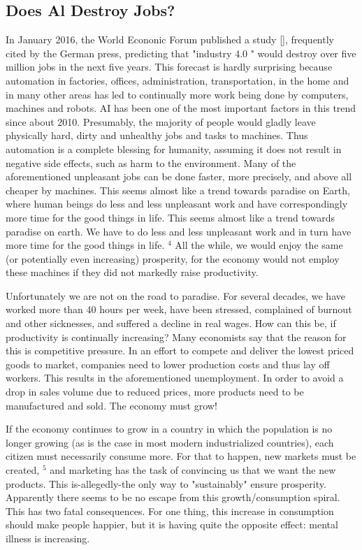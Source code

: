 \documentclass[10pt]{book}
\begin{document}
\subsection{Does Al Destroy Jobs?}
In January 2016, the World Econonic Forum published a study [\cite{ss16}], frequently cited by the German press, predicting that "industry 4.0 " would destroy over five\\
million jobs in the next five years. This forecast is hardly surprising because automation in factories, offices, administration, transportation, in the home and in many other areas has led to continually more work being done by computers, machines and robots. AI has been one of the most important factors in this trend since about 2010.
Presumably, the majority of people would gladly leave physically hard, dirty and unhealthy jobs and tasks to machines. Thus automation is a complete blessing for humanity, assuming it does not result in negative side effects, such as harm to the environment. Many of the aforementioned unpleasant jobs can be done faster, more precisely, and above all cheaper by machines. This seems almost like a trend towards paradise on Earth, where human beings do less and less unpleasant work and have correspondingly more time for the good things in life. This seems almost like a trend towards paradise on earth. We have to do less and less unpleasant work and in turn have more time for the good things in life. ${ }^{4}$ All the while, we would enjoy the same (or potentially even increasing) prosperity, for the economy would not employ these machines if they did not markedly raise productivity.

Unfortunately we are not on the road to paradise. For several decades, we have worked more than 40 hours per week, have been stressed, complained of burnout and other sicknesses, and suffered a decline in real wages. How can this be, if productivity is continually increasing? Many economists say that the reason for this is competitive pressure. In an effort to compete and deliver the lowest priced goods to market, companies need to lower production costs and thus lay off workers. This results in the aforementioned unemployment. In order to avoid a drop in sales volume due to reduced prices, more products need to be manufactured and sold. The economy must grow!

If the economy continues to grow in a country in which the population is no longer growing (as is the case in most modern industrialized countries), each citizen must necessarily consume more. For that to happen, new markets must be created, ${ }^{5}$ and marketing has the task of convincing us that we want the new products. This is-allegedly-the only way to "sustainably" ensure prosperity. Apparently there seems to be no escape from this growth/consumption spiral. This has two fatal consequences. For one thing, this increase in consumption should make people happier, but it is having quite the opposite effect: mental illness is increasing.
\end{document}
